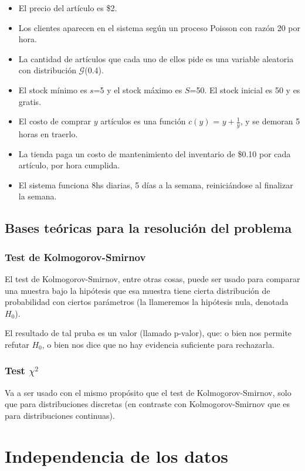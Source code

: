 \documentclass[a4paper,10pt]{article}
\begin{document}
\begin{itemize}
 \item El precio del artículo es \$2.
 \item Los clientes aparecen en el sistema según un proceso Poisson con razón 20 por hora.
 \item La cantidad de artículos que cada uno de ellos pide es una variable aleatoria con distribución $\mathcal{G}$(0.4).
 \item El stock mínimo es $s$=5 y el stock máximo es $S$=50. El stock inicial es 50 y es gratis.
 \item El costo de comprar $y$ artículos es una función $c(y)$ = $y + \frac{1}{y}$, y se demoran 5 horas en traerlo.
 \item La tienda paga un costo de mantenimiento del inventario de \$0.10 por cada artículo, por hora cumplida.
 \item El sistema funciona 8hs diarias, 5 días a la semana, reiniciándose al finalizar la semana.
\end{itemize}

\subsection{Bases teóricas para la resolución del problema}
\vspace{0.4in}
\subsubsection{Test de Kolmogorov-Smirnov}
El test de Kolmogorov-Smirnov, entre otras cosas, puede ser usado para comparar una muestra bajo la hipótesis que esa
muestra tiene cierta distribución de probabilidad con ciertos parámetros (la llameremos la hipótesis nula, denotada $H_0$).

El resultado de tal pruba es un valor (llamado p-valor), que: o bien nos permite refutar $H_0$, o bien nos dice que
no hay evidencia suficiente para rechazarla.


\subsubsection{Test $\chi^2$}
Va a ser usado con el mismo propósito que el test de Kolmogorov-Smirnov, solo que para distribuciones discretas (en contraste
con Kolmogorov-Smirnov que es para distribuciones continuas).

\pagebreak

\section{Independencia de los datos}
\end{document}
